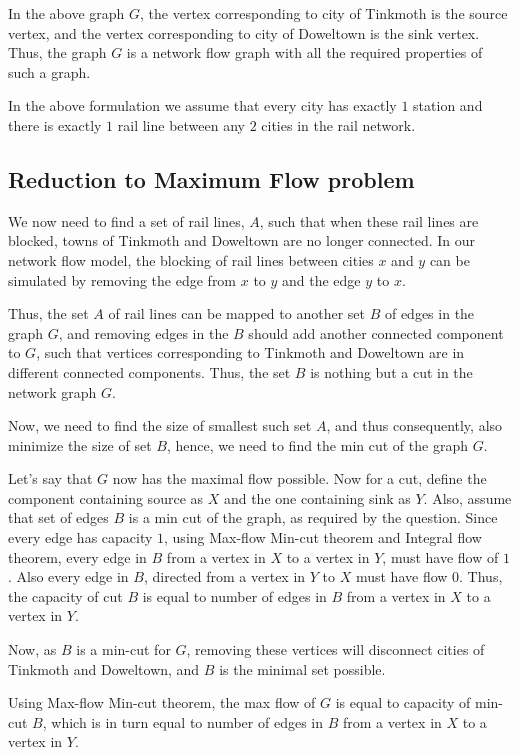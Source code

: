 \documentclass{article}
\begin{document}
In the above graph $G$, the vertex corresponding to city of Tinkmoth is the source vertex, and the vertex corresponding to city of Doweltown is the sink vertex. Thus, the graph $G$ is a network flow graph with all the required properties of such a graph.

In the above formulation we assume that every city has exactly $1$ station and there is exactly $1$ rail line between any $2$ cities in the rail network.

\subsection{Reduction to Maximum Flow problem}

We now need to find a set of rail lines, $A$, such that when these rail lines are blocked, towns of Tinkmoth and Doweltown are no longer connected. In our network flow model, the blocking of rail lines between cities $x$ and $y$ can be simulated by removing the edge from $x$ to $y$ and the edge $y$ to $x$. 

Thus, the set $A$ of rail lines can be mapped to another set $B$ of edges in the graph $G$, and removing edges in the $B$ should add another connected component to $G$, such that vertices corresponding to Tinkmoth and Doweltown are in different connected components. Thus, the set $B$ is nothing but a cut in the network graph $G$.

Now, we need to find the size of smallest such set $A$, and thus consequently, also minimize the size of set $B$, hence, we need to find the min cut of the graph $G$.

Let's say that $G$ now has the maximal flow possible. Now for a cut, define the component containing source as $X$ and the one containing sink as $Y$. Also, assume that set of edges $B$ is a min cut of the graph, as required by the question. Since every edge has capacity $1$, using Max-flow Min-cut theorem and Integral flow theorem, every edge in $B$ from a vertex in $X$ to a vertex in $Y$, must have flow of $1$. Also every edge in $B$, directed from a vertex in $Y$ to $X$ must have flow $0$. Thus, the capacity of cut $B$ is equal to number of edges in $B$ from a vertex in $X$ to a vertex in $Y$. 

Now, as $B$ is a min-cut for $G$, removing these vertices will disconnect cities of Tinkmoth and Doweltown, and $B$ is the minimal set possible. 

Using Max-flow Min-cut theorem, the max flow of $G$ is equal to capacity of min-cut $B$, which is in turn equal to number of edges in $B$ from a vertex in $X$ to a vertex in $Y$.
\end{document}
